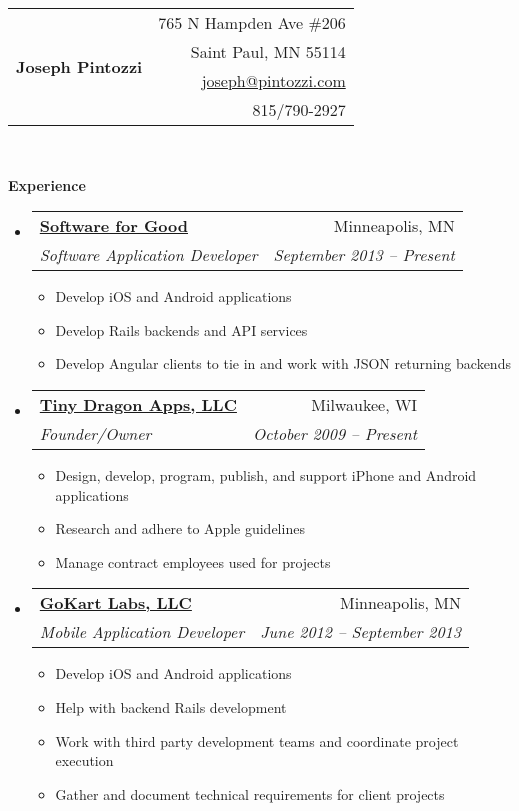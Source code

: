 \documentclass[letterpaper,12pt]{article}
\makeatletter
\newcommand{\resitem}[1]{\item #1 \vspace{-2pt}}
\newcommand{\resheading}[1]{{\large \colorbox{mygrey}{\begin{minipage}{\textwidth}{\textbf{#1 \vphantom{p\^{E}}}}\end{minipage}}}}
\newcommand{\ressubheading}[4]{
\begin{tabular*}{6.5in}{l@{\extracolsep{\fill}}r}
		\textbf{#1} & #2 \\
		\textit{#3} & \textit{#4} \\
\end{tabular*}\vspace{-6pt}}
\makeatother
\begin{document}
\newcommand{\mywebheader}{
\begin{tabular*}{7in}{l@{\extracolsep{\fill}}r}
	\multirow{4}{*}{\huge \bf Joseph Pintozzi} & {765 N Hampden Ave \#206}\\
														& {Saint Paul, MN 55114}\\
														& \href{mailto:joseph@pintozzi.com}{joseph@pintozzi.com}\\
														& {815/790-2927}
	\end{tabular*}
\\
\vspace{0.1in}
}

\mywebheader

\resheading{Experience}
	\begin{itemize}
     \item 
			\ressubheading{\href{http://softwareforgood.com/}{Software for Good}}{Minneapolis, MN}{Software Application Developer}{September 2013 -- Present}
				{ \footnotesize
				\begin{itemize}
					\resitem{Develop iOS and Android applications}
					\resitem{Develop Rails backends and API services}
					\resitem{Develop Angular clients to tie in and work with JSON returning backends}
				\end{itemize}
         }
      \item 
			\ressubheading{\href{http://itunes.apple.com/WebObjects/MZStore.woa/wa/viewArtist?id=337595590}{Tiny Dragon Apps, LLC}}{Milwaukee, WI}{Founder/Owner}{October 2009 -- Present}
				{ \footnotesize
				\begin{itemize}
					\resitem{Design, develop, program, publish, and support iPhone and Android applications}
					\resitem{Research and adhere to Apple guidelines}
					\resitem{Manage contract employees used for projects}
				\end{itemize}
         }
     \item 
			\ressubheading{\href{http://www.gokartlabs.com}{GoKart Labs, LLC}}{Minneapolis, MN}{Mobile Application Developer}{June 2012 -- September 2013}
				{ \footnotesize
				\begin{itemize}
					\resitem{Develop iOS and Android applications}
					\resitem{Help with backend Rails development}
					\resitem{Work with third party development teams and coordinate project execution}
					\resitem{Gather and document technical requirements for client projects}
				\end{itemize}
         }

\end{itemize}
\end{document}

